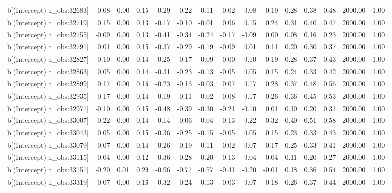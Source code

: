 \begin{table}[ht]
\begin{tabular}{rrrrrrrrrrrrrrr}
  b[(Intercept) n\_obs:32683] & 0.08 & 0.00 & 0.15 & -0.29 & -0.22 & -0.11 & -0.02 & 0.08 & 0.19 & 0.28 & 0.38 & 0.48 & 2000.00 & 1.00 \\ 
  b[(Intercept) n\_obs:32719] & 0.15 & 0.00 & 0.13 & -0.17 & -0.10 & -0.01 & 0.06 & 0.15 & 0.24 & 0.31 & 0.40 & 0.47 & 2000.00 & 1.00 \\ 
  b[(Intercept) n\_obs:32755] & -0.09 & 0.00 & 0.13 & -0.41 & -0.34 & -0.24 & -0.17 & -0.09 & 0.00 & 0.08 & 0.16 & 0.23 & 2000.00 & 1.00 \\ 
  b[(Intercept) n\_obs:32791] & 0.01 & 0.00 & 0.15 & -0.37 & -0.29 & -0.19 & -0.09 & 0.01 & 0.11 & 0.20 & 0.30 & 0.37 & 2000.00 & 1.00 \\ 
  b[(Intercept) n\_obs:32827] & 0.10 & 0.00 & 0.14 & -0.25 & -0.17 & -0.09 & -0.00 & 0.10 & 0.19 & 0.28 & 0.37 & 0.43 & 2000.00 & 1.00 \\ 
  b[(Intercept) n\_obs:32863] & 0.05 & 0.00 & 0.14 & -0.31 & -0.23 & -0.13 & -0.05 & 0.05 & 0.15 & 0.24 & 0.33 & 0.42 & 2000.00 & 1.00 \\ 
  b[(Intercept) n\_obs:32899] & 0.17 & 0.00 & 0.16 & -0.23 & -0.13 & -0.03 & 0.07 & 0.17 & 0.28 & 0.37 & 0.48 & 0.56 & 2000.00 & 1.00 \\ 
  b[(Intercept) n\_obs:32935] & 0.17 & 0.00 & 0.14 & -0.19 & -0.11 & -0.02 & 0.08 & 0.17 & 0.26 & 0.36 & 0.45 & 0.53 & 2000.00 & 1.00 \\ 
  b[(Intercept) n\_obs:32971] & -0.10 & 0.00 & 0.15 & -0.48 & -0.39 & -0.30 & -0.21 & -0.10 & 0.01 & 0.10 & 0.20 & 0.31 & 2000.00 & 1.00 \\ 
  b[(Intercept) n\_obs:33007] & 0.22 & 0.00 & 0.14 & -0.14 & -0.06 & 0.04 & 0.13 & 0.22 & 0.32 & 0.40 & 0.51 & 0.58 & 2000.00 & 1.00 \\ 
  b[(Intercept) n\_obs:33043] & 0.05 & 0.00 & 0.15 & -0.36 & -0.25 & -0.15 & -0.05 & 0.05 & 0.15 & 0.23 & 0.33 & 0.43 & 2000.00 & 1.00 \\ 
  b[(Intercept) n\_obs:33079] & 0.07 & 0.00 & 0.14 & -0.26 & -0.19 & -0.11 & -0.02 & 0.07 & 0.17 & 0.25 & 0.33 & 0.41 & 2000.00 & 1.00 \\ 
  b[(Intercept) n\_obs:33115] & -0.04 & 0.00 & 0.12 & -0.36 & -0.28 & -0.20 & -0.13 & -0.04 & 0.04 & 0.11 & 0.20 & 0.27 & 2000.00 & 1.00 \\ 
  b[(Intercept) n\_obs:33151] & -0.20 & 0.01 & 0.29 & -0.96 & -0.77 & -0.57 & -0.41 & -0.20 & -0.01 & 0.18 & 0.36 & 0.54 & 2000.00 & 1.00 \\ 
  b[(Intercept) n\_obs:33319] & 0.07 & 0.00 & 0.16 & -0.32 & -0.24 & -0.13 & -0.03 & 0.07 & 0.18 & 0.26 & 0.37 & 0.44 & 2000.00 & 1.00 \\ 

\end{tabular}
\end{table}
